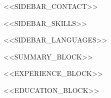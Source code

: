 \documentclass[10pt,a4paper,withhyper]{altacv}
\begin{document}
\begin{leftcolumn}
<<SIDEBAR_CONTACT>>
\end{leftcolumn}

\begin{leftcolumn}
<<SIDEBAR_SKILLS>>
\end{leftcolumn}

\begin{leftcolumn}
<<SIDEBAR_LANGUAGES>>
\end{leftcolumn}

<<SUMMARY_BLOCK>>

<<EXPERIENCE_BLOCK>>

<<EDUCATION_BLOCK>>
\end{document}
